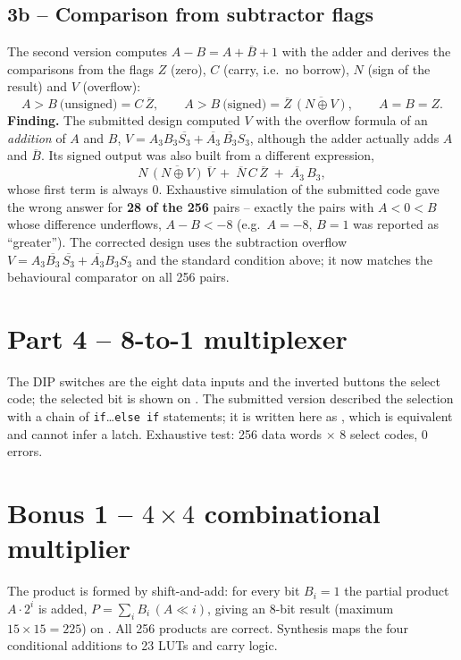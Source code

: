 \subsection{3b -- Comparison from subtractor flags}
The second version computes $A-B = A+\overline{B}+1$ with the adder and derives the comparisons from the
flags $Z$ (zero), $C$ (carry, i.e.\ no borrow), $N$ (sign of the result) and $V$ (overflow):
\[
A>B\ \text{(unsigned)} = C\,\overline{Z}, \qquad
A>B\ \text{(signed)} = \overline{Z}\,\overline{(N\oplus V)}, \qquad
A=B = Z .
\]
\textbf{Finding.} The submitted design computed $V$ with the overflow formula of an \emph{addition}
of $A$ and $B$, $V=A_3B_3\overline{S_3}+\overline{A_3}\,\overline{B_3}S_3$, although the adder actually adds
$A$ and $\overline{B}$. Its signed output was also built from a different expression,
\[
N\,\overline{(N\oplus V)}\,\overline{V} \;+\; \overline{N}\,C\,\overline{Z} \;+\; \overline{A_3}\,B_3 ,
\]
whose first term is always 0. Exhaustive simulation of the submitted code gave the wrong answer for
\textbf{28 of the 256} pairs -- exactly the pairs with $A<0<B$ whose difference underflows, $A-B<-8$
(e.g.\ $A=-8$, $B=1$ was reported as ``greater''). The corrected design uses the subtraction overflow
$V=A_3\overline{B_3}\,\overline{S_3}+\overline{A_3}B_3S_3$ and the standard condition above; it now matches
the behavioural comparator on all 256 pairs.

\section{Part 4 -- 8-to-1 multiplexer}
The DIP switches are the eight data inputs and the inverted buttons  the select code;
the selected bit is shown on . The submitted version described the selection with a chain of
\texttt{if}\ldots\texttt{else if} statements; it is written here as , which is
equivalent and cannot infer a latch. Exhaustive test: 256 data words $\times$ 8 select codes, 0 errors.

\section{Bonus 1 -- \texorpdfstring{$4\times4$}{4x4} combinational multiplier}
The product is formed by shift-and-add: for every bit $B_i=1$ the partial product $A\cdot2^i$ is added,
$P=\sum_i B_i\,(A\ll i)$, giving an 8-bit result (maximum $15\times15=225$) on . All 256
products are correct. Synthesis maps the four conditional additions to 23 LUTs and carry logic.

